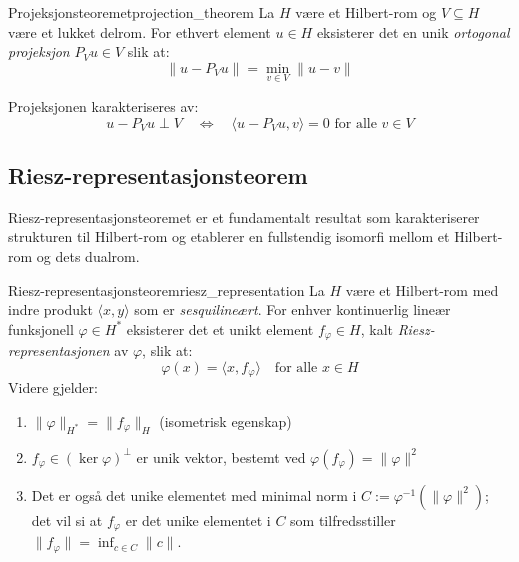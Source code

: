 \documentclass[../../main.tex]{subfiles}
\begin{document}
\begin{theorem}{Projeksjonsteoremet}{projection_theorem}
    La $H$ være et Hilbert-rom og $V \subseteq H$ være et lukket delrom. For ethvert element $u \in H$ eksisterer det en unik \emph{ortogonal projeksjon} $P_V u \in V$ slik at:
    \begin{equation}
        \|u - P_V u\| = \min_{v \in V} \|u - v\|
    \end{equation}

    Projeksjonen karakteriseres av:
    \begin{equation}
        u - P_V u \perp V \quad \Leftrightarrow \quad \langle u - P_V u, v \rangle = 0 \text{ for alle } v \in V
    \end{equation}
\end{theorem}

\subsection{Riesz-representasjonsteorem}
Riesz-representasjonsteoremet er et fundamentalt resultat som karakteriserer strukturen til Hilbert-rom og etablerer en fullstendig isomorfi mellom et Hilbert-rom og dets dualrom.
\begin{theorem}{Riesz-representasjonsteorem}{riesz_representation}
    La $H$ være et Hilbert-rom med indre produkt $\langle x, y \rangle$ som er \emph{sesquilineært}.
    For enhver kontinuerlig lineær funksjonell $\varphi \in H^\ast$ eksisterer det et unikt element $f_\varphi \in H$, kalt \emph{Riesz-representasjonen} av $\varphi$, slik at:
    \begin{equation}
        \varphi(x) = \langle x, f_\varphi \rangle \quad \text{for alle } x \in H
    \end{equation}
    Videre gjelder:
    \begin{enumerate}
        \item \(\|\varphi\|_{H^\ast} = \|f_\varphi\|_H\) (isometrisk egenskap)
        \item \(f_\varphi \in (\ker \varphi)^\perp\) er unik vektor, bestemt ved \(\varphi(f_\varphi) = \|\varphi\|^2\)
        \item Det er også det unike elementet med minimal norm i \( C := \varphi^{-1}(\|\varphi\|^2) \); det vil si at \( f_\varphi \) er det unike elementet i \( C \) som tilfredsstiller \( \|f_\varphi\| = \inf_{c \in C} \|c\| \).
    \end{enumerate}
\end{theorem}
\end{document}
